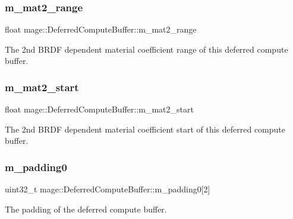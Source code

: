 \subsubsection{\texorpdfstring{m\+\_\+mat2\+\_\+range}{m\_mat2\_range}}
{\footnotesize\ttfamily float mage\+::\+Deferred\+Compute\+Buffer\+::m\+\_\+mat2\+\_\+range}

The 2nd B\+R\+DF dependent material coefficient range of this deferred compute buffer. \hypertarget{structmage_1_1_deferred_compute_buffer_a7e3c3ecd99c36759966dee95113cf205}{}\label{structmage_1_1_deferred_compute_buffer_a7e3c3ecd99c36759966dee95113cf205} 
\subsubsection{\texorpdfstring{m\+\_\+mat2\+\_\+start}{m\_mat2\_start}}
{\footnotesize\ttfamily float mage\+::\+Deferred\+Compute\+Buffer\+::m\+\_\+mat2\+\_\+start}

The 2nd B\+R\+DF dependent material coefficient start of this deferred compute buffer. \hypertarget{structmage_1_1_deferred_compute_buffer_a2a93aeab5e3984c69896095698d2ec7d}{}\label{structmage_1_1_deferred_compute_buffer_a2a93aeab5e3984c69896095698d2ec7d} 
\subsubsection{\texorpdfstring{m\+\_\+padding0}{m\_padding0}}
{\footnotesize\ttfamily uint32\+\_\+t mage\+::\+Deferred\+Compute\+Buffer\+::m\+\_\+padding0\mbox{[}2\mbox{]}}

The padding of the deferred compute buffer. \hypertarget{structmage_1_1_deferred_compute_buffer_a94f0fdcbb9a0255362c2af5232a9ea55}{}\label{structmage_1_1_deferred_compute_buffer_a94f0fdcbb9a0255362c2af5232a9ea55} 
